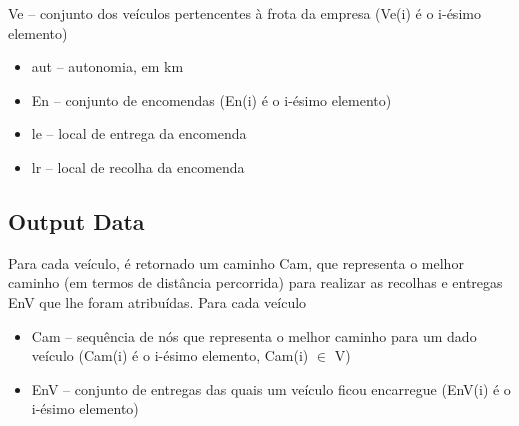\documentclass[12pt]{article}
\begin{document}
\vspace{\baselineskip}
Ve – conjunto dos veículos pertencentes à frota da empresa (Ve(i) é o i-ésimo elemento)
\begin{itemize}
	\item aut – autonomia, em km

\vspace{\baselineskip}
    \item En – conjunto de encomendas (En(i) é o i-ésimo elemento)
	\item le – local de entrega da encomenda
	\item lr – local de recolha da encomenda
\end{itemize}

\subsection{Output Data}
Para cada veículo, é retornado um caminho Cam, que representa o melhor caminho (em termos de distância percorrida) para realizar as recolhas e entregas EnV que lhe foram atribuídas.
Para cada veículo
\begin{itemize}
	\item Cam – sequência de nós que representa o melhor caminho para um dado veículo (Cam(i) é o i-ésimo elemento, Cam(i) $ \in $  V)
	\item EnV – conjunto de entregas das quais um veículo ficou encarregue (EnV(i) é o i-ésimo elemento)
\end{itemize}
\end{document}
